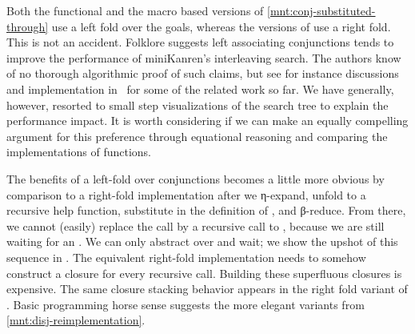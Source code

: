 \documentclass[sigplan,balance,pbalance,natbib=false]{acmart}
\begin{document}
Both the functional and the macro based versions of
\cref{mnt:conj-substituted-through} use a left fold over the goals,
whereas the versions of  use a right fold. This is
not an accident.
%
Folklore suggests left associating conjunctions tends to improve the
performance of miniKanren's interleaving search. The authors know of
no thorough algorithmic proof of such claims, but see for instance
discussions and implementation in~\cite{rosenblatt2019first} for some
of the related work so far. We have generally, however, resorted to
small step visualizations of the search tree to explain the
performance impact. It is worth considering if we can make an equally
compelling argument for this preference through equational reasoning
and comparing the implementations of functions.


The benefits of a left-fold over conjunctions becomes a little more
obvious by comparison to a right-fold implementation after we
η-expand, unfold to a recursive help function, substitute in the
definition of , and β-reduce. From there, we cannot
(easily) replace the  call by a recursive call
to , because we are still waiting for an .
We can only abstract over  and wait; we show the upshot
of this sequence in . The
equivalent right-fold implementation needs to somehow construct a
closure for every recursive call. Building these superfluous closures
is expensive. The same closure stacking behavior appears in the right
fold variant of . Basic programming horse sense
suggests the more elegant variants from
\cref{mnt:disj-reimplementation}.
\end{document}
